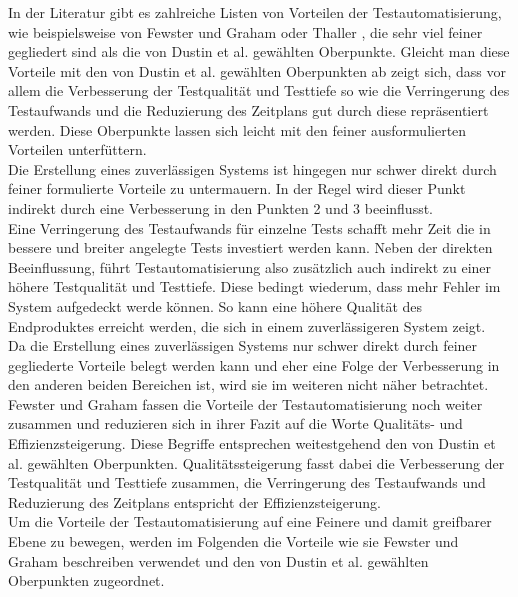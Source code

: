 In der Literatur gibt es zahlreiche Listen von Vorteilen der Testautomatisierung, wie beispielsweise von Fewster und Graham \cite[vgl. S.9 ff.]{fewster_software_1999} oder Thaller \cite[vgl. S.28 ff.]{thaller_software-test_2002}, die sehr viel feiner gegliedert sind als die von Dustin et al. \cite[S.44 ff.]{dustin_software_2001} gewählten Oberpunkte. 
Gleicht man diese Vorteile mit den von Dustin et al. gewählten Oberpunkten ab zeigt sich, dass vor allem die Verbesserung der Testqualität und Testtiefe so wie die Verringerung des Testaufwands und die Reduzierung des Zeitplans gut durch diese repräsentiert werden. Diese Oberpunkte lassen sich leicht mit den feiner ausformulierten Vorteilen unterfüttern.\\ Die Erstellung eines zuverlässigen Systems ist hingegen nur schwer direkt durch feiner formulierte Vorteile zu untermauern. In der Regel wird dieser Punkt indirekt durch eine Verbesserung in den Punkten 2 und 3 beeinflusst.\\
Eine Verringerung des Testaufwands für einzelne Tests schafft mehr Zeit die in bessere und breiter angelegte Tests investiert werden kann. Neben der direkten Beeinflussung, führt Testautomatisierung also zusätzlich auch indirekt zu einer höhere Testqualität und Testtiefe. Diese bedingt wiederum, dass mehr Fehler im System aufgedeckt werde können. So kann eine höhere Qualität des Endproduktes erreicht werden, die sich in einem zuverlässigeren System zeigt.\\
Da die Erstellung eines zuverlässigen Systems nur schwer direkt durch feiner gegliederte Vorteile belegt werden kann und eher eine Folge der Verbesserung in den anderen beiden Bereichen ist, wird sie im weiteren nicht näher betrachtet.\\
Fewster und Graham \cite[vgl. S.10]{fewster_software_1999} fassen die Vorteile der Testautomatisierung noch weiter zusammen und reduzieren sich in ihrer Fazit auf die Worte Qualitäts- und Effizienzsteigerung.
Diese Begriffe entsprechen weitestgehend den von Dustin et al. gewählten Oberpunkten. Qualitätssteigerung fasst dabei die Verbesserung der Testqualität und Testtiefe zusammen, die Verringerung des Testaufwands und Reduzierung des Zeitplans entspricht der Effizienzsteigerung.\\
Um die Vorteile der Testautomatisierung auf eine Feinere und damit greifbarer Ebene zu bewegen, werden im Folgenden die Vorteile wie sie 
Fewster und Graham beschreiben verwendet und den von Dustin et al. gewählten Oberpunkten zugeordnet.

